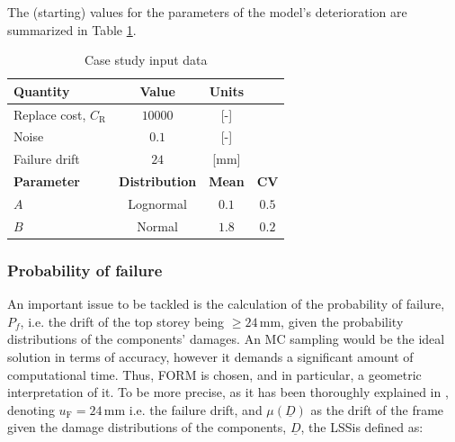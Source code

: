 \vspace{1cm}

\newpage

The (starting) values for the parameters of the model's deterioration are summarized in Table \ref{caseStudyInput}.

\begin{table}[H]
    \centering
    \caption{Case study input data}
    \label{caseStudyInput}
    \begin{tabular}{lccc}
        \toprule
        \textbf{Quantity} & \textbf{Value} & \textbf{Units} &  \\ \midrule
        Replace cost, $C_{\text{R}}$ & $10000$ & {[}-{]} &  \\
        Noise & $0.1$ & {[}-{]} &  \\
        Failure drift & $24$ & {[}mm{]} &  \\ \midrule
        \textbf{Parameter} & \textbf{Distribution} & \textbf{Mean} & \multicolumn{1}{c}{\textbf{\gls{CV}}} \\ \midrule
        $A$ & Lognormal & $0.1$ & \multicolumn{1}{c}{$0.5$} \\
        $B$ & Normal & $1.8$ & \multicolumn{1}{c}{$0.2$} \\ \bottomrule
    \end{tabular}
\end{table}



\subsubsection{Probability of failure}

An important issue to be tackled is the calculation of the probability of failure, $P_f$, i.e. the drift of the top storey being $\geq 24\, \mathrm{mm}$, given the probability distributions of the components' damages. An \gls{MC} sampling would be the ideal solution in terms of accuracy, however it demands a significant amount of computational time. Thus, \gls{FORM} is chosen, and in particular, a geometric interpretation of it. To be more precise, as it has been thoroughly explained in \cite{cicirello2014efficient}, denoting $u_{\text{F}} = 24 \, \mathrm{mm}$ i.e. the failure drift, and $\mu(\underline{D})$ as the drift of the frame given the damage distributions of the components, $\underline{D}$, the \acrfull{LSS}\footnotemark is defined as:

